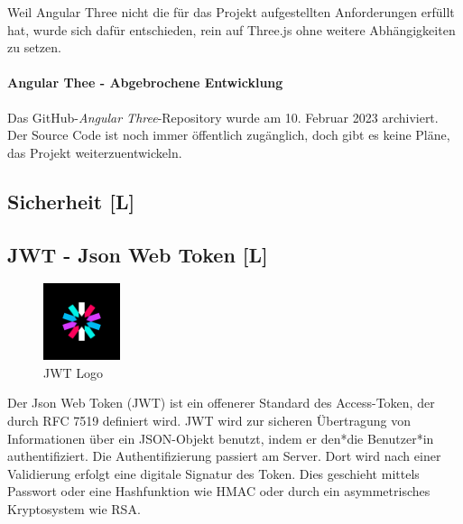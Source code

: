 Weil Angular Three nicht die für das Projekt aufgestellten Anforderungen erfüllt hat, wurde sich dafür entschieden, rein auf Three.js ohne weitere Abhängigkeiten zu setzen.

\paragraph{Angular Thee - Abgebrochene Entwicklung}
Das GitHub-\emph{Angular Three}-Repository wurde am 10. Februar 2023 archiviert. Der Source Code ist noch immer öffentlich zugänglich, doch gibt es keine Pläne, das Projekt weiterzuentwickeln. \cite{AngularTheeGithub} 

\subsection{Sicherheit [L]}

\subsection{JWT - Json Web Token [L]}
\begin{figure}
  \begin{center}
    \includegraphics[width=0.2\textwidth]{pics/jwt_logo.png}
   \caption{JWT Logo}
  \end{center}
\end{figure}
Der Json Web Token (JWT) ist ein offenerer Standard des Access-Token, der durch RFC 7519 definiert wird. JWT wird zur sicheren Übertragung von Informationen über ein JSON-Objekt benutzt, indem er den*die Benutzer*in authentifiziert. Die Authentifizierung passiert am Server. Dort wird nach einer Validierung erfolgt eine digitale Signatur des Token. Dies geschieht mittels Passwort oder eine Hashfunktion wie HMAC oder durch ein asymmetrisches Kryptosystem wie RSA. \cite{jwtAuth0}


